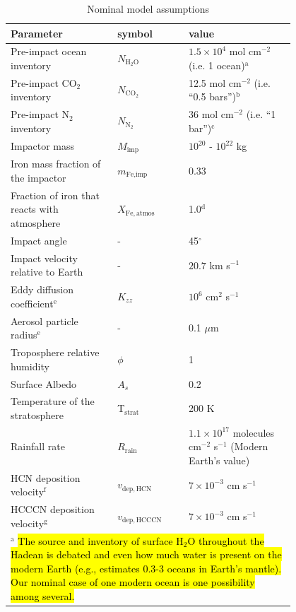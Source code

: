 \begin{table}
  \begin{center}
  \begin{tabularx}{0.9\linewidth}{p{0.3\linewidth} | p{0.2\linewidth} | p{0.3\linewidth}} \caption{Nominal model assumptions} \label{tab:fiducial_parameters} \\
    \hline \hline
    Parameter & symbol & value \\
    \hline
    Pre-impact ocean inventory & $N_\mathrm{H_2O}$ & $1.5 \times 10^4$ mol cm$^{-2}$ (i.e. 1 ocean)$^\text{a}$ 
    \\
    Pre-impact CO$_2$ inventory & $N_\mathrm{CO_2}$ & 12.5 mol cm$^{-2}$ (i.e. ``0.5 bars'')$^\text{b}$  
    \\
    Pre-impact N$_2$ inventory & $N_\mathrm{N_2}$ & 36 mol cm$^{-2}$ (i.e. ``1 bar'')$^\text{c}$  
    \\
    Impactor mass & $M_\text{imp}$ & $10^{20}$ - $10^{22}$ kg
    \\
    Iron mass fraction of the impactor & $m_\text{Fe,imp}$ & 0.33 
    \\
    Fraction of iron that reacts with atmosphere & $X_\mathrm{Fe,atmos}$ & 1.0$^\text{d}$ 
    \\
    Impact angle & - & 45$^{\circ}$
    \\
    Impact velocity relative to Earth & - & $20.7$ km s$^{-1}$
    \\
    Eddy diffusion coefficient$^\text{e}$ & $K_{zz}$ & $10^6$ cm$^{2}$ s$^{-1}$ 
    \\
    Aerosol particle radius$^\text{e}$ & - & 0.1 $\mu$m
    \\
    Troposphere relative humidity & $\phi$ & 1 
    \\
    Surface Albedo & $A_s$ & 0.2 
    \\
    Temperature of the stratosphere & T$_\mathrm{strat}$ & 200 K 
    \\
    Rainfall rate & $R_\mathrm{rain}$ & $1.1 \times 10^{17}$ molecules cm$^{-2}$ s$^{-1}$  (Modern Earth's value) 
    \\
    HCN deposition velocity$^\text{f}$ & $v_\mathrm{dep,HCN}$ & $7 \times 10^{-3}$ cm s$^{-1}$
    \\
    HCCCN deposition velocity$^\text{g}$ & $v_\mathrm{dep,HCCCN}$ & $7 \times 10^{-3}$ cm s$^{-1}$
    \\
    \hline
    \multicolumn{3}{p{0.9\linewidth}}{
    $^\text{a}$ \hl{The source and inventory of surface H$_2$O throughout the Hadean is debated \mbox{\citep{Miyazaki_2022,Korenaga_2021,Johnson_2020}} and even how much water is present on the modern Earth (e.g., \mbox{\citet{Lecuyer_1998}} estimates 0.3-3 oceans in Earth's mantle). Our nominal case of one modern ocean is one possibility among several.}

}
\end{tabularx}
\end{center}
\end{table}
